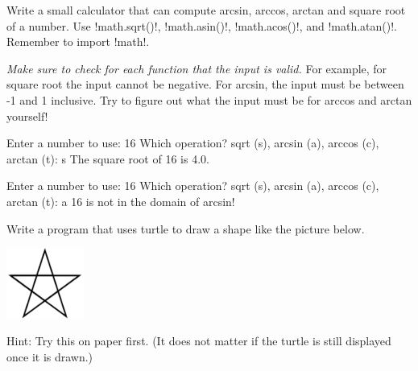 \documentclass[11pt]{cselabheader}
\begin{document}
\begin{ex}[calculator.py] Write a small calculator that can compute arcsin, arccos,
    arctan and square root of a number. Use \pythoninline!math.sqrt()!,
    \pythoninline!math.asin()!, \pythoninline!math.acos()!, and
    \pythoninline!math.atan()!. Remember to import \pythoninline!math!.

    \emph{Make sure to check for each function that the input is valid.} For
    example, for square root the input cannot be negative. For arcsin, the input
    must be between -1 and 1 inclusive. Try to figure out what the input must be
    for arccos and arctan yourself!

    \begin{verbatimcode}
Enter a number to use: 16
Which operation? sqrt (s), arcsin (a), arccos (c), arctan (t): s
The square root of 16 is 4.0.
    \end{verbatimcode}

    \begin{verbatimcode}
Enter a number to use: 16
Which operation? sqrt (s), arcsin (a), arccos (c), arctan (t): a
16 is not in the domain of arcsin!
    \end{verbatimcode}

\end{ex}

\begin{ex}[star.py] Write a program that uses turtle to draw a shape like
	the picture below.
  
    \begin{center}
      \includegraphics[width=1.0in]{img/star}
    \end{center}

    Hint: Try this on paper first. (It does not matter if the turtle is still
    displayed once it is drawn.)
  \end{ex}
\end{document}
